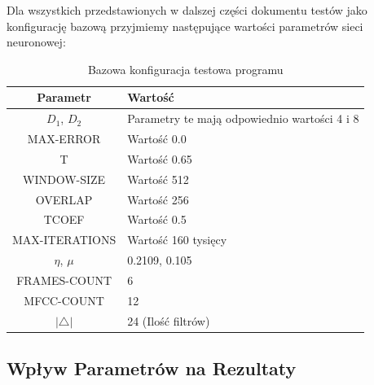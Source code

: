 \documentclass[a4paper]{article}
\begin{document}
	Dla wszystkich przedstawionych w dalszej części dokumentu testów jako 
	konfigurację bazową przyjmiemy następujące wartości parametrów sieci neuronowej:
	\begin{table}[h]
			\centering
			\begin{tabular}{|c|p{8cm}|}
				\hline
				Parametr &  Wartość \\
				\hline \hline
				$D_1$, $D_2$ & Parametry te mają odpowiednio wartości 4 i 8 \\
				\hline
				MAX-ERROR & Wartość 0.0 \\
				\hline
				T & Wartość 0.65 \\
				\hline
				WINDOW-SIZE & Wartość 512 \\
				\hline
				OVERLAP & Wartość 256 \\
				\hline
				TCOEF & Wartość 0.5 \\
				\hline
				MAX-ITERATIONS & Wartość 160 tysięcy \\
				\hline
				$\eta$, $\mu$ & 0.2109, 0.105 \\
				\hline
				FRAMES-COUNT & 6 \\
				\hline
				MFCC-COUNT & 12 \\
				\hline
				$|\bigtriangleup|$ & 24 (Ilość filtrów) \\
				\hline
			\end{tabular}			
			\caption{Bazowa konfiguracja testowa programu}
			\label{tab:testparams}
		\end{table}	
			
	\subsection{Wpływ Parametrów na Rezultaty}
\end{document}
